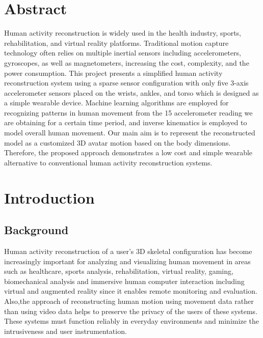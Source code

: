 \documentclass[12pt, a4paper, oneside]{report}
\begin{document}


\renewcommand{\thepage}{\roman{page}} %

\chapter*{Abstract}
Human activity reconstruction is widely used in the health industry, sports, rehabilitation, and virtual reality platforms. Traditional motion capture technology often relies on multiple inertial sensors including accelerometers, gyroscopes, as well as magnetometers, increasing the cost, complexity, and the power consumption.
This project presents a simplified human activity reconstruction system using a sparse sensor configuration with only five 3-axis accelerometer sensors placed on the wrists, ankles, and torso which is designed as a simple wearable device. Machine learning algorithms are employed for recognizing patterns in human movement from the 15 accelerometer reading we are obtaining for a certain time period, and inverse kinematics is employed to model overall human movement. Our main aim is to represent the reconstructed model as a customized 3D avatar motion based on the body dimensions. Therefore, the proposed approach demonstrates a low cost and simple wearable alternative to conventional human activity reconstruction systems.

\newpage

\tableofcontents
\newpage

\listoffigures
\newpage

\listoftables
\newpage

\acuseall %
\printacronyms
\newpage

\renewcommand{\thepage}{\arabic{page}} %
\setcounter{page}{1} %

\chapter{Introduction}
\section{Background}
\noindent Human activity reconstruction of a user’s 3D skeletal configuration has become increasingly important for analyzing and visualizing human movement in areas such as healthcare, sports analysis, rehabilitation, virtual reality, gaming, biomechanical analysis and immersive human computer interaction including virtual and augmented reality since it enables remote monitoring and evaluation. Also,the approach of reconstructing human motion using movement data rather than using video data helps to preserve the privacy of the users of these systems. These systems must function reliably in everyday environments and minimize the intrusiveness and user instrumentation.\vspace{\baselineskip}
\end{document}
